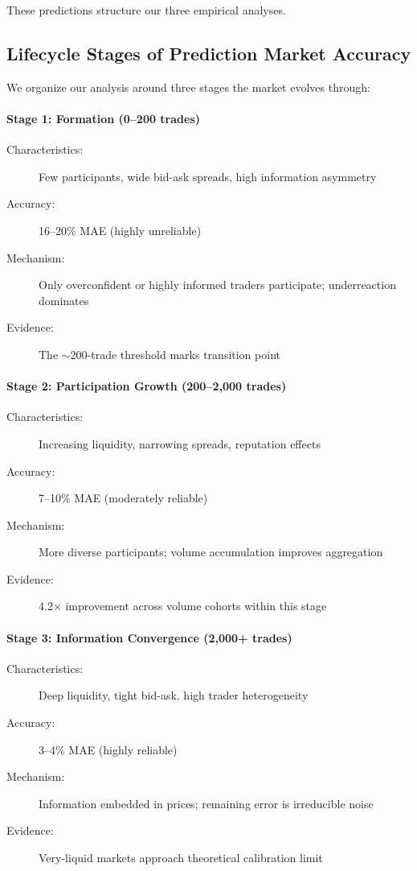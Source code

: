 \documentclass[a4paper,11pt]{article}
\theoremstyle{plain}
\theoremstyle{definition}
\theoremstyle{remark}
\begin{document}
These predictions structure our three empirical analyses.

\subsection{Lifecycle Stages of Prediction Market Accuracy}
\label{subsec:stages}

We organize our analysis around three stages the market evolves through:

\paragraph{Stage 1: Formation (0--200 trades)}
\begin{description}
    \item[Characteristics:] Few participants, wide bid-ask spreads, high information asymmetry
    \item[Accuracy:] 16--20\% MAE (highly unreliable)
    \item[Mechanism:] Only overconfident or highly informed traders participate; underreaction dominates
    \item[Evidence:] The $\sim$200-trade threshold marks transition point
\end{description}

\paragraph{Stage 2: Participation Growth (200--2,000 trades)}
\begin{description}
    \item[Characteristics:] Increasing liquidity, narrowing spreads, reputation effects
    \item[Accuracy:] 7--10\% MAE (moderately reliable)
    \item[Mechanism:] More diverse participants; volume accumulation improves aggregation
    \item[Evidence:] 4.2$\times$ improvement across volume cohorts within this stage
\end{description}

\paragraph{Stage 3: Information Convergence (2,000+ trades)}
\begin{description}
    \item[Characteristics:] Deep liquidity, tight bid-ask, high trader heterogeneity
    \item[Accuracy:] 3--4\% MAE (highly reliable)
    \item[Mechanism:] Information embedded in prices; remaining error is irreducible noise
    \item[Evidence:] Very-liquid markets approach theoretical calibration limit
\end{description}
\end{document}
